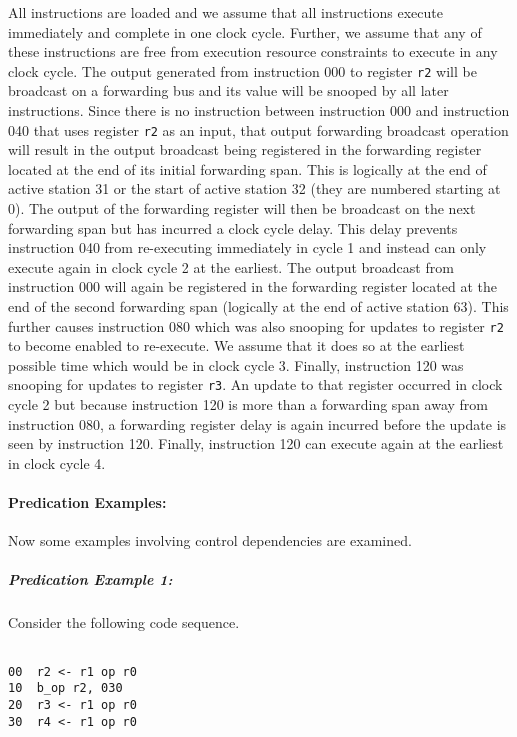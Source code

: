 \documentclass[10pt,dvips]{article}
\begin{document}
All instructions are loaded and we assume that all
instructions execute immediately and complete in one clock cycle.
Further, we assume that any of these instructions are free
from execution resource constraints to execute in any clock cycle.
The output generated from instruction 000 to register
{\tt r2}
will be broadcast on a forwarding bus and its value will be snooped
by all later instructions.  Since there is no instruction
between instruction 000 and instruction 040 that uses 
register
{\tt r2} as an input,
that output forwarding broadcast operation will result
in the output broadcast being registered in the forwarding register
located at the end of its initial forwarding span.  This
is logically at the end of active station 31 or the start of active station
32
(they are numbered starting at 0).
The output of the forwarding register will then be broadcast
on the next forwarding span but has incurred a clock cycle delay.
This delay prevents instruction 040 from re-executing immediately
in cycle 1 and instead can only execute again in clock cycle 2
at the earliest.  The output broadcast from instruction 000
will again be registered in the forwarding register located
at the end of the second forwarding span (logically at the
end of active station 63).  This further causes instruction 080
which was also snooping for updates to register
{\tt r2}
to become enabled to re-execute.  We assume that it does so
at the earliest possible time which would be in clock cycle 3.
Finally, instruction 120 was snooping for updates to register
{\tt r3}.
An update to that register occurred in clock cycle 2 but because
instruction 120 is more than a forwarding span away from instruction
080, a forwarding register delay is again incurred before the update
is seen by instruction 120.  Finally, instruction 120 can execute
again at the earliest in clock cycle 4.

\paragraph{Predication Examples: }
Now some examples involving control dependencies are
examined. 

\subparagraph{Predication Example 1: }
Consider the following code sequence.

\begin{verbatim}

00	r2 <- r1 op r0
10	b_op r2, 030
20	r3 <- r1 op r0
30	r4 <- r1 op r0

\end{verbatim}
\end{document}
